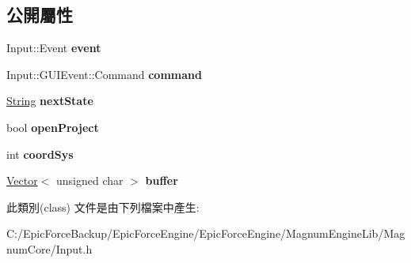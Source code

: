 \subsection*{公開屬性}
\begin{DoxyCompactItemize}
\item 
Input\+::\+Event {\bfseries event}\hypertarget{class_magnum_1_1_input_1_1_g_u_i_event_a3cee910f904b816457fc855f6f40ccdd}{}\label{class_magnum_1_1_input_1_1_g_u_i_event_a3cee910f904b816457fc855f6f40ccdd}

\item 
Input\+::\+G\+U\+I\+Event\+::\+Command {\bfseries command}\hypertarget{class_magnum_1_1_input_1_1_g_u_i_event_ad58b690bc1c4e29eb5de450cd1ccc31c}{}\label{class_magnum_1_1_input_1_1_g_u_i_event_ad58b690bc1c4e29eb5de450cd1ccc31c}

\item 
\hyperlink{class_magnum_1_1_string}{String} {\bfseries next\+State}\hypertarget{class_magnum_1_1_input_1_1_g_u_i_event_a48fb4bad2cf2de4e402f90b16f43b41e}{}\label{class_magnum_1_1_input_1_1_g_u_i_event_a48fb4bad2cf2de4e402f90b16f43b41e}

\item 
bool {\bfseries open\+Project}\hypertarget{class_magnum_1_1_input_1_1_g_u_i_event_a7c398b4dbd0e237bda1e6fd672e3825b}{}\label{class_magnum_1_1_input_1_1_g_u_i_event_a7c398b4dbd0e237bda1e6fd672e3825b}

\item 
int {\bfseries coord\+Sys}\hypertarget{class_magnum_1_1_input_1_1_g_u_i_event_a3d3a3efcd51b40e6ac5acb0779e69e98}{}\label{class_magnum_1_1_input_1_1_g_u_i_event_a3d3a3efcd51b40e6ac5acb0779e69e98}

\item 
\hyperlink{class_magnum_1_1_vector}{Vector}$<$ unsigned char $>$ {\bfseries buffer}\hypertarget{class_magnum_1_1_input_1_1_g_u_i_event_ac89a09cbea4ef4ca9c16e04eefcd8d56}{}\label{class_magnum_1_1_input_1_1_g_u_i_event_ac89a09cbea4ef4ca9c16e04eefcd8d56}

\end{DoxyCompactItemize}


此類別(class) 文件是由下列檔案中產生\+:\begin{DoxyCompactItemize}
\item 
C\+:/\+Epic\+Force\+Backup/\+Epic\+Force\+Engine/\+Epic\+Force\+Engine/\+Magnum\+Engine\+Lib/\+Magnum\+Core/Input.\+h\end{DoxyCompactItemize}
